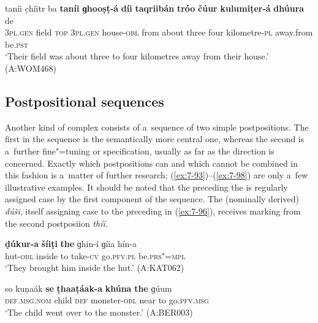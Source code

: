 \begin{exe}
\ea
\label{ex:7-92}
\gll taníi c̣híitr ba \textbf{taníi} \textbf{ɡhooṣṭ-á} \textbf{díi} \textbf{taqriibán} \textbf{tróo} \textbf{čúur} \textbf{kulumiṭer-á} \textbf{dhúura} de\\
\textsc{3pl.gen} field \textsc{top} \textsc{3pl.gen} house-\textsc{obl} from about three four kilometre-\textsc{pl} away.from be.\textsc{pst}\\
\glt `Their field was about three to four kilometres away from their house.' (A:WOM468)
\z

\subsection{Postpositional sequences}
\label{subsec:7-2-4}

Another kind of complex  consists of a~sequence of two simple postpositions. The first in the sequence is the semantically more central one, whereas the second is a~further fine"=tuning or specification, usually as far as the direction is concerned. Exactly which postpositions can and which cannot be combined in this fashion is a~matter of further research; (\ref{ex:7-93})--(\ref{ex:7-98}) are only a~few illustrative examples. It should be noted that the  preceding the  is regularly assigned case by the first component of the sequence. The (nominally derived)  \textit{dúši}, itself assigning  case to the preceding  in (\ref{ex:7-96}), receives  marking from the second postposiion \textit{thíi}.
\largerpage

\begin{exe}
\ex
\label{ex:7-93}
\gll \textbf{ḍúkur-a} \textbf{šíiṭi} \textbf{the} ɡhin-í ɡíia hín-a \\
hut-\textsc{obl} inside to take-\textsc{cv} go.\textsc{pfv.pl} be.\textsc{prs"=mpl} \\
\glt `They brought him inside the hut.' (A:KAT062)
\end{exe}
\begin{exe}
\ex
\label{ex:7-94}
\gll so kuṇaák \textbf{se} \textbf{ṭhaaṭáak-a} \textbf{khúna} \textbf{the} ɡúum \\
\textsc{def.msg.nom} child \textsc{def} monster-\textsc{obl} near to go.\textsc{pfv.msg} \\
\glt `The child went over to the monster.' (A:BER003)
\end{exe}



\end{exe}
